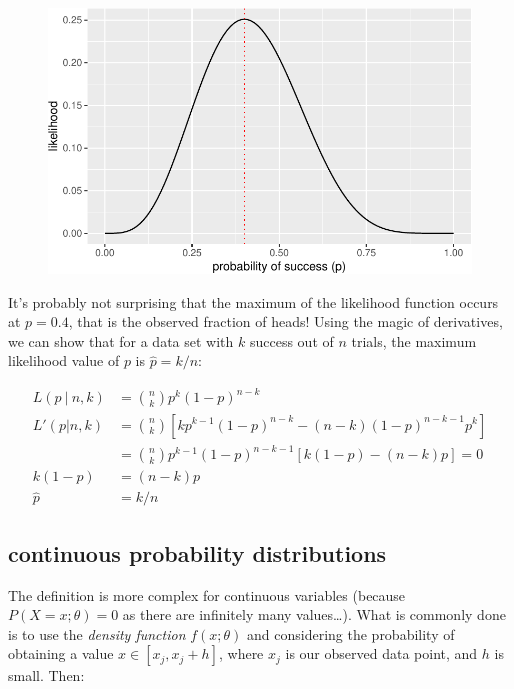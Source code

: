 \documentclass[
  letterpaper,
  DIV=11,
  numbers=noendperiod]{scrreprt}
\begin{document}
\begin{figure}[H]

{\centering \includegraphics{./06-likelihood_files/figure-pdf/unnamed-chunk-2-1.pdf}

}

\end{figure}

It's probably not surprising that the maximum of the likelihood function
occurs at \(p=0.4\), that is the observed fraction of heads! Using the
magic of derivatives, we can show that for a data set with \(k\) success
out of \(n\) trials, the maximum likelihood value of \(p\) is
\(\hat p = k/n\):

\[ 
\begin{aligned}
L(p  \ \vert \ n, k) &= {n \choose k} p^k (1-p)^{n-k} \\ \hline
L'(p | n, k ) &= {n \choose k}\left [ kp^{k-1}(1-p)^{n-k} - (n-k) (1-p)^{n-k-1}p^k \right] \\
&={n \choose k} p^{k-1} (1-p)^{n-k-1} \left [ k(1-p) - (n-k)p \right] = 0 \\
\hline
k(1-p) &= (n-k)p \\
\hat p &= k/n
\end{aligned}
\]

\hypertarget{continuous-probability-distributions}{%
\subsection{continuous probability
distributions}\label{continuous-probability-distributions}}

The definition is more complex for continuous variables (because
\(P(X = x; \theta) = 0\) as there are infinitely many values\ldots).
What is commonly done is to use the \emph{density function}
\(f(x; \theta)\) and considering the probability of obtaining a value
\(x \in [x_j, x_j + h]\), where \(x_j\) is our observed data point, and
\(h\) is small. Then:
\end{document}
